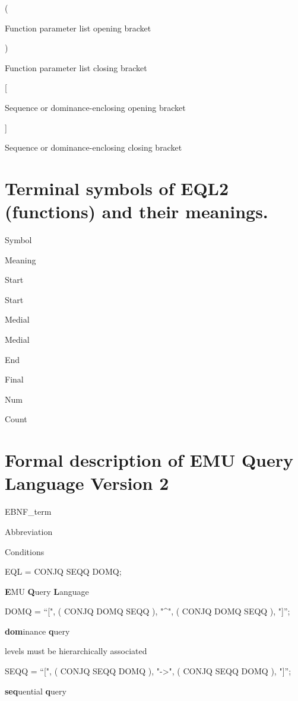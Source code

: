 \documentclass[
]{book}
\begin{document}
(

Function parameter list opening bracket

)

Function parameter list closing bracket

{[}

Sequence or dominance-enclosing opening bracket

{]}

Sequence or dominance-enclosing closing bracket

\hypertarget{terminal-symbols-of-eql2-functions-and-their-meanings.}{%
\section{Terminal symbols of EQL2 (functions) and their meanings.}\label{terminal-symbols-of-eql2-functions-and-their-meanings.}}

Symbol

Meaning

Start

Start

Medial

Medial

End

Final

Num

Count

\hypertarget{formal-description-of-emu-query-language-version-2}{%
\section{Formal description of EMU Query Language Version 2}\label{formal-description-of-emu-query-language-version-2}}

EBNF\_term

Abbreviation

Conditions

EQL = CONJQ \textbar{} SEQQ \textbar{} DOMQ;

\textbf{E}MU \textbf{Q}uery \textbf{L}anguage

DOMQ = ``{[}", ( CONJQ \textbar{} DOMQ \textbar{} SEQQ ), "\^{}", ( CONJQ \textbar{} DOMQ \textbar{} SEQQ ), "{]}'';

\textbf{dom}inance \textbf{q}uery

levels must be hierarchically associated

SEQQ = ``{[}", ( CONJQ \textbar{} SEQQ \textbar{} DOMQ ), "-\textgreater", ( CONJQ \textbar{} SEQQ \textbar{} DOMQ ), "{]}'';

\textbf{seq}uential \textbf{q}uery
\end{document}
